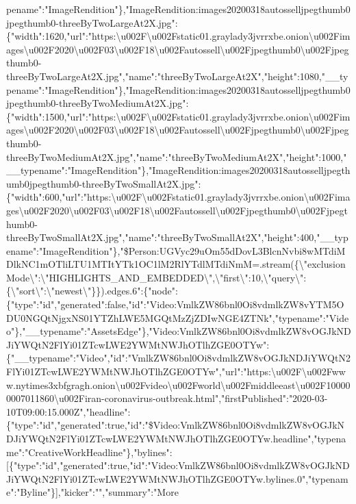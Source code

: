 pename":"ImageRendition"\},"ImageRendition:images20200318autosselljpegthumb0jpegthumb0-threeByTwoLargeAt2X.jpg":\{"width":1620,"url":"https:\textbackslash{}u002F\textbackslash{}u002Fstatic01.graylady3jvrrxbe.onion\textbackslash{}u002Fimages\textbackslash{}u002F2020\textbackslash{}u002F03\textbackslash{}u002F18\textbackslash{}u002Fautossell\textbackslash{}u002Fjpegthumb0\textbackslash{}u002Fjpegthumb0-threeByTwoLargeAt2X.jpg","name":"threeByTwoLargeAt2X","height":1080,"\_\_typename":"ImageRendition"\},"ImageRendition:images20200318autosselljpegthumb0jpegthumb0-threeByTwoMediumAt2X.jpg":\{"width":1500,"url":"https:\textbackslash{}u002F\textbackslash{}u002Fstatic01.graylady3jvrrxbe.onion\textbackslash{}u002Fimages\textbackslash{}u002F2020\textbackslash{}u002F03\textbackslash{}u002F18\textbackslash{}u002Fautossell\textbackslash{}u002Fjpegthumb0\textbackslash{}u002Fjpegthumb0-threeByTwoMediumAt2X.jpg","name":"threeByTwoMediumAt2X","height":1000,"\_\_typename":"ImageRendition"\},"ImageRendition:images20200318autosselljpegthumb0jpegthumb0-threeByTwoSmallAt2X.jpg":\{"width":600,"url":"https:\textbackslash{}u002F\textbackslash{}u002Fstatic01.graylady3jvrrxbe.onion\textbackslash{}u002Fimages\textbackslash{}u002F2020\textbackslash{}u002F03\textbackslash{}u002F18\textbackslash{}u002Fautossell\textbackslash{}u002Fjpegthumb0\textbackslash{}u002Fjpegthumb0-threeByTwoSmallAt2X.jpg","name":"threeByTwoSmallAt2X","height":400,"\_\_typename":"ImageRendition"\},"\$Person:UGVyc29uOm55dDovL3BlcnNvbi8wMTdiMDlkNC1mOTliLTU1MTItYTk1OC1lM2RlYTdlMTdiNmM=.stream(\{\textbackslash{}"exclusionMode\textbackslash{}":\textbackslash{}"HIGHLIGHTS\_AND\_EMBEDDED\textbackslash{}",\textbackslash{}"first\textbackslash{}":10,\textbackslash{}"query\textbackslash{}":\{\textbackslash{}"sort\textbackslash{}":\textbackslash{}"newest\textbackslash{}"\}\}).edges.6":\{"node":\{"type":"id","generated":false,"id":"Video:VmlkZW86bnl0Oi8vdmlkZW8vYTM5ODU0NGQtNjgxNS01YTZhLWE5MGQtMzZjZDIwNGE4ZTNk","typename":"Video"\},"\_\_typename":"AssetsEdge"\},"Video:VmlkZW86bnl0Oi8vdmlkZW8vOGJkNDJiYWQtN2FlYi01ZTcwLWE2YWMtNWJhOTlhZGE0OTYw":\{"\_\_typename":"Video","id":"VmlkZW86bnl0Oi8vdmlkZW8vOGJkNDJiYWQtN2FlYi01ZTcwLWE2YWMtNWJhOTlhZGE0OTYw","url":"https:\textbackslash{}u002F\textbackslash{}u002Fwww.nytimes3xbfgragh.onion\textbackslash{}u002Fvideo\textbackslash{}u002Fworld\textbackslash{}u002Fmiddleeast\textbackslash{}u002F100000007011860\textbackslash{}u002Firan-coronavirus-outbreak.html","firstPublished":"2020-03-10T09:00:15.000Z","headline":\{"type":"id","generated":true,"id":"\$Video:VmlkZW86bnl0Oi8vdmlkZW8vOGJkNDJiYWQtN2FlYi01ZTcwLWE2YWMtNWJhOTlhZGE0OTYw.headline","typename":"CreativeWorkHeadline"\},"bylines":{[}\{"type":"id","generated":true,"id":"Video:VmlkZW86bnl0Oi8vdmlkZW8vOGJkNDJiYWQtN2FlYi01ZTcwLWE2YWMtNWJhOTlhZGE0OTYw.bylines.0","typename":"Byline"\}{]},"kicker":"","summary":"More
